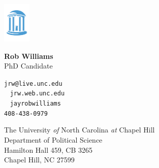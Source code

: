 \documentclass[10pt]{article}
\begin{document}
	

\includegraphics[width=0.1\textwidth]{logo_front}%
\hspace{1mm}
\parbox{2in}{
	\vspace{-1cm}
    \textbf{Rob Williams} \\
    PhD Candidate
}

\vspace{.5mm}
\hspace{9mm}
\parbox{2in}{
	\small
	\faEnvelopeO \hspace{.65mm} \texttt{jrw@live.unc.edu} \\
	\faGlobe ~ \texttt{jrw.web.unc.edu} \\
	\faGithub ~ \texttt{jayrobwilliams} \\
	\faPhone \hspace{1.30mm} \texttt{408-438-0979}
}

\vspace{3mm}
\hspace{9mm}
\parbox{2.5in}{
	\footnotesize
	\textsf{\textcolor{uncblue}{The University \emph{of} North Carolina \emph{at} Chapel Hill}}\\
	\scriptsize Department of Political Science \\
	Hamilton Hall 459, CB 3265 \\
	Chapel Hill, NC 27599
}
\end{document}
